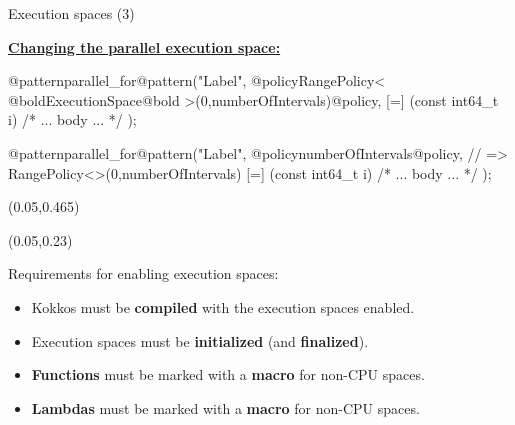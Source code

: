 
\begin{frame}[fragile]{Execution spaces (3)}

  \textbf{\ul{Changing the parallel execution space:}}

  \vspace{3pt}

  \begin{code}[linebackgroundcolor={
        \btLstHL<1->{4}{bodyColor}
      },
      frame=single
    ]
@patternparallel_for@pattern("Label",
  @policyRangePolicy< @boldExecutionSpace@bold >(0,numberOfIntervals)@policy,
  [=] (const int64_t i) {
    /* ... body ... */
  });
  \end{code}

  \begin{code}[linebackgroundcolor={
        \btLstHL<1->{4}{bodyColor}
      },
      frame=single
    ]
@patternparallel_for@pattern("Label",
  @policynumberOfIntervals@policy, // => RangePolicy<>(0,numberOfIntervals)
  [=] (const int64_t i) {
    /* ... body ... */
  });
  \end{code}

  \begin{textblock*}{0.5\textwidth}(0.05\textwidth,0.465\textheight)
  \end{textblock*}

  \begin{textblock*}{0.5\textwidth}(0.05\textwidth,0.23\textheight)
  \end{textblock*}

  \pause

  Requirements for enabling execution spaces:
  \vspace{-3pt}
  \begin{itemize}
    \item{Kokkos must be \textbf{compiled} with the execution spaces enabled.}
    \item{Execution spaces must be \textbf{initialized} (and \textbf{finalized}).}
    \item{\textbf{Functions} must be marked with a \textbf{macro} for non-CPU spaces.}
    \item{\textbf{Lambdas} must be marked with a \textbf{macro} for non-CPU spaces.}
  \end{itemize}

\end{frame}

